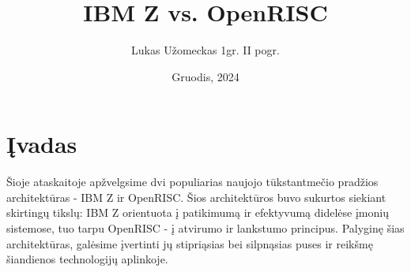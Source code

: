\documentclass[a4paper]{article}
\title{IBM Z vs. OpenRISC}
\author{Lukas Užomeckas 1gr. II pogr.}
\date{Gruodis, 2024}
\begin{document}
\maketitle

\section{Įvadas}
Šioje ataskaitoje apžvelgsime dvi populiarias naujojo tūkstantmečio pradžios architektūras - IBM Z ir OpenRISC. Šios architektūros buvo sukurtos siekiant skirtingų tikslų: IBM Z orientuota į patikimumą ir efektyvumą didelėse įmonių sistemose, tuo tarpu OpenRISC - į atvirumo ir lankstumo principus. Palyginę šias architektūras, galėsime įvertinti jų stipriąsias bei silpnąsias puses ir reikšmę šiandienos technologijų aplinkoje.

\printbibliography
\end{document}
